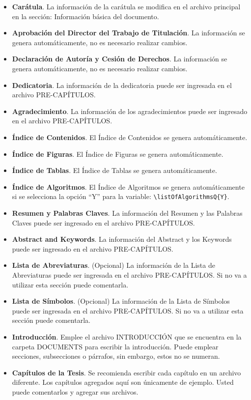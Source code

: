 \begin{itemize}
	\item \textbf{Carátula}. La información de la carátula se modifica en el archivo principal en la sección: Información básica del documento.  
	\item \textbf{Aprobación del Director del Trabajo de Titulación}. La información se genera automáticamente, no es necesario realizar cambios. 
	\item \textbf{Declaración de Autoría y Cesión de Derechos}. La información se genera automáticamente, no es necesario realizar cambios. 
	\item \textbf{Dedicatoria}. La información de la dedicatoria puede ser ingresada en el archivo PRE-CAPÍTULOS. 
	\item \textbf{Agradecimiento}. La información de los agradecimientos puede ser ingresado en el archivo PRE-CAPÍTULOS. 
	\item \textbf{Índice de Contenidos}. El Índice de Contenidos se genera automáticamente. 
	\item \textbf{Índice de Figuras}. El Índice de Figuras se genera automáticamente. 
	\item \textbf{Índice de Tablas}. El Índice de Tablas se genera automáticamente.
	 \item \textbf{Índice de Algoritmos}. El Índice de Algoritmos se genera automáticamente si se selecciona la opción ``Y'' para la variable: \lstinline|\listOfAlgorithmsQ{Y}|.
	\item \textbf{Resumen y Palabras Claves}. La información del Resumen y las Palabras Claves puede ser ingresado en el archivo PRE-CAPÍTULOS.
	\item \textbf{Abstract and Keywords}. La información del Abstract y los Keywords puede ser ingresado en el archivo PRE-CAPÍTULOS.
	\item \textbf{Lista de Abreviaturas}. (Opcional) La información de la Lista de Abreviaturas puede ser ingresada en el archivo PRE-CAPÍTULOS. Si no va a utilizar esta sección puede comentarla. 
	\item \textbf{Lista de Símbolos}. (Opcional) La información de la Lista de Símbolos puede ser ingresada en el archivo PRE-CAPÍTULOS. Si no va a utilizar esta sección puede comentarla. 
	\item \textbf{Introducción}. Emplee el archivo INTRODUCCIÓN que se encuentra en la carpeta DOCUMENTS para escribir la introducción. Puede emplear secciones, subsecciones o párrafos, sin embargo, estos no se numeran. 
	\item \textbf{Capítulos de la Tesis}. Se recomienda escribir cada capítulo en un archivo diferente. Los capítulos agregados aquí son únicamente de ejemplo. Usted puede comentarlos y agregar sus archivos.  

\end{itemize}
